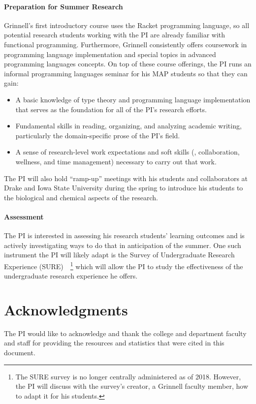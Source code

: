 \documentclass[11pt]{article}
\begin{document}
\paragraph{Preparation for Summer Research}

Grinnell's first introductory course uses the Racket programming language, so all potential research students working with the PI are already familiar with functional programming.
Furthermore, Grinnell consistently offers coursework in programming language implementation and special topics in advanced programming languages concepts.
On top of these course offerings, the PI runs an informal programming languages seminar for his MAP students so that they can gain:
\begin{itemize}[itemsep=0pt]
  \item A basic knowledge of type theory and programming language implementation that serves as the foundation for all of the PI's research efforts.
  \item Fundamental skills in reading, organizing, and analyzing academic writing, particularly the domain-specific prose of the PI's field.
  \item A sense of research-level work expectations and soft skills (\eg, collaboration, wellness, and time management) necessary to carry out that work.
\end{itemize}
The PI will also hold ``ramp-up'' meetings with his students and collaborators at Drake and Iowa State University during the spring to introduce his students to the biological and chemical aspects of the research.

\paragraph{Assessment}
The PI is interested in assessing his research students' learning outcomes and is actively investigating ways to do that in anticipation of the summer.
One such instrument the PI will likely adapt is the Survey of Undergraduate Research Experience (SURE)~\cite{lopatto:tcp:2008}~\footnote{%
  The SURE survey is no longer centrally administered as of 2018.
  However, the PI will discuss with the survey's creator, a Grinnell faculty member, how to adapt it for his students.
} which will allow the PI to study the effectiveness of the undergraduate research experience he offers.

\section{Acknowledgments}
The PI would like to acknowledge and thank the college and department faculty and staff for providing the resources and statistics that were cited in this document.

\newpage



\end{document}
